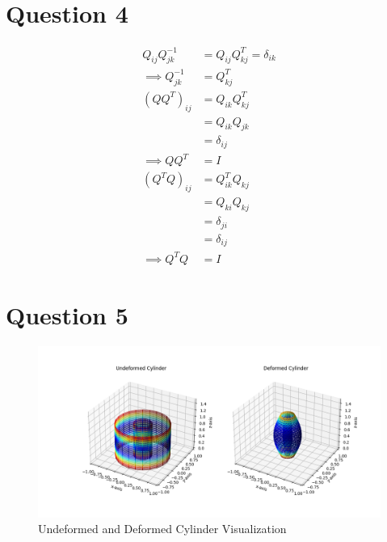 \documentclass[a4paper,12pt]{article} %
\begin{document}
\newpage
\section{\textbf{Question 4}}
\begin{align*}
    Q_{ij} Q^{-1}_{jk} &= Q_{ij} Q^T_{kj} = \delta_{ik} \\
    \implies Q^{-1}_{jk} &= Q^T_{kj}\\
    (QQ^T)_{ij} &= Q_{ik} Q^T_{kj} \\
&= Q_{ik} Q_{jk} \\
&= \delta_{ij} \\
\implies QQ^T &= I\\
(Q^TQ)_{ij} &= Q^T_{ik} Q_{kj} \\
&= Q_{ki} Q_{kj} \\
&= \delta_{ji} \\
&= \delta_{ij} \\
\implies Q^TQ &= I
\end{align*}

\newpage
\section{\textbf{Question 5}}
\begin{figure}[htbp]
    \includegraphics[scale=0.5]{MECH503HW1Q5.png}
    
    \caption{Undeformed and Deformed Cylinder Visualization}
\label{figure}
\end{figure}
\end{document}
